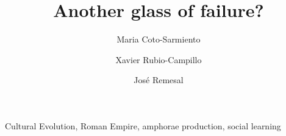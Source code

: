 \documentclass[review]{elsarticle}
\begin{document}
\begin{frontmatter}

\title{Another glass of failure? }


\author[bscadress]{Maria Coto-Sarmiento }
\author[edadress]{Xavier Rubio-Campillo}
\author[ceipacadress]{Jos\'e Remesal}




\address[bscadress]{Barcelona Supercomputing Center (BSC), Barcelona, Spain}
\address[edadress]{University of Edinburgh, UK}
\address[ceipacadress]{CEIPAC, University of Barcelona, Barcelona, Spain}
\begin{abstract}
\end{abstract}

\begin{keyword}Cultural Evolution, Roman Empire, amphorae production, social learning
\end{keyword}

 \end{frontmatter}

\linenumbers


\end{document}
